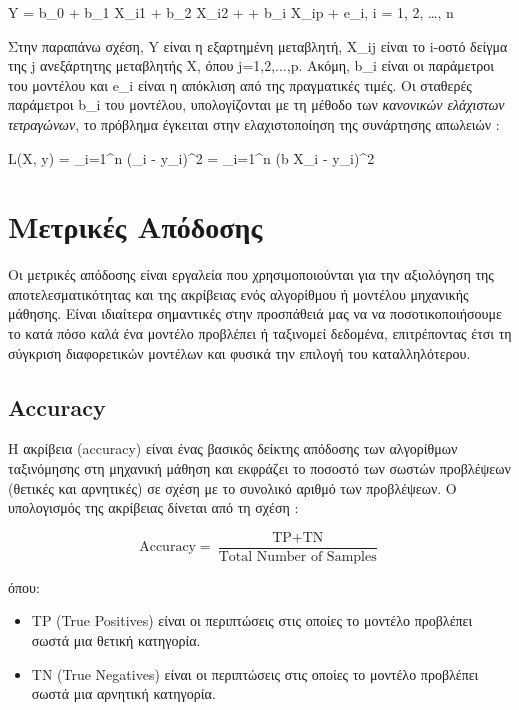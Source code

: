 \documentclass[diploma]{softlab-thesis}
\begin{document}
Y = b_0 + b_1 X_{i1} + b_2 X_{i2} + \cdots + b_i X_{ip} + e_i, \quad {} i = 1, 2, \ldots, n \vspace{1cm}


Στην παραπάνω σχέση, Y είναι η εξαρτημένη μεταβλητή, X_{ij} είναι το i-οστό δείγμα της j ανεξάρτητης μεταβλητής X, όπου j=1,2,...,p. Ακόμη, b_i είναι οι παράμετροι του μοντέλου και e_i είναι η απόκλιση από της πραγματικές τιμές. Οι σταθερές παράμετροι b_i του μοντέλου, υπολογίζονται με τη μέθοδο των \textit{κανονικών ελάχιστων τετραγώνων}, το πρόβλημα έγκειται στην ελαχιστοποίηση της συνάρτησης απωλειών : \vspace{1cm}

L(X, y) = \sum_{i=1}^n (_i - y_i)^2 = \sum_{i=1}^n (b \cdot X_i - y_i)^2 \vspace{1cm}



\section{Μετρικές Απόδοσης}

Οι μετρικές απόδοσης είναι εργαλεία που χρησιμοποιούνται για την αξιολόγηση της αποτελεσματικότητας και της ακρίβειας ενός αλγορίθμου ή μοντέλου μηχανικής μάθησης. Είναι ιδιαίτερα σημαντικές στην προσπάθειά μας να να ποσοτικοποιήσουμε το κατά πόσο καλά ένα μοντέλο προβλέπει ή ταξινομεί δεδομένα, επιτρέποντας έτσι τη σύγκριση διαφορετικών μοντέλων και φυσικά την επιλογή του καταλληλότερου.

\subsection{
Accuracy}

Η ακρίβεια (accuracy) είναι ένας βασικός δείκτης απόδοσης των αλγορίθμων ταξινόμησης στη μηχανική μάθηση και εκφράζει το ποσοστό των σωστών προβλέψεων (θετικές και αρνητικές) σε σχέση με το συνολικό αριθμό των προβλέψεων. Ο υπολογισμός της ακρίβειας δίνεται από τη σχέση : 

\[
\text{Accuracy} = \frac{\text{TP} + \text{TN}}{\text{Total Number of Samples}}
\]

όπου:

\begin{itemize}
\item TP (True Positives) είναι οι περιπτώσεις στις οποίες το μοντέλο προβλέπει σωστά μια θετική κατηγορία.
\item TN (True Negatives) είναι οι περιπτώσεις στις οποίες το μοντέλο προβλέπει σωστά μια αρνητική κατηγορία.
\end{itemize}
\end{document}
